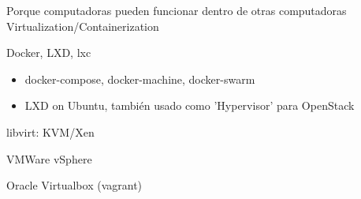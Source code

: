 \begin{cventries}
  \cventry
    {Porque computadoras pueden funcionar dentro de otras computadoras}
    {Virtualization/Containerization}
    {}
    {}
    {
      \begin{cvitems}
        \item Docker, LXD, lxc
          \begin{itemize}
            \item docker-compose, docker-machine, docker-swarm
            \item LXD on Ubuntu, también usado como 'Hypervisor' para OpenStack
          \end{itemize}
        \item libvirt: KVM/Xen
        \item VMWare vSphere
        \item Oracle Virtualbox (vagrant)
      \end{cvitems}
    }


\end{cventries}
